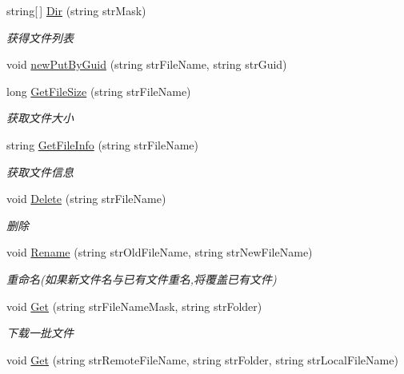 \begin{DoxyCompactItemize}
string\mbox{[}$\,$\mbox{]} \hyperlink{class_x_c_l_net_tools_1_1_f_t_p_1_1_f_t_p_client_a9563c1fa35e755073b9b279caaf7e354}{Dir} (string str\+Mask)
\begin{DoxyCompactList}\small\item\em 获得文件列表 \end{DoxyCompactList}\item 
void \hyperlink{class_x_c_l_net_tools_1_1_f_t_p_1_1_f_t_p_client_a502eb52b0575947170695c4fcbccc10a}{new\+Put\+By\+Guid} (string str\+File\+Name, string str\+Guid)
\item 
long \hyperlink{class_x_c_l_net_tools_1_1_f_t_p_1_1_f_t_p_client_a39be7d18214835a62484226fc12e2061}{Get\+File\+Size} (string str\+File\+Name)
\begin{DoxyCompactList}\small\item\em 获取文件大小 \end{DoxyCompactList}\item 
string \hyperlink{class_x_c_l_net_tools_1_1_f_t_p_1_1_f_t_p_client_abcdeced5a90923ad5788251d4012694f}{Get\+File\+Info} (string str\+File\+Name)
\begin{DoxyCompactList}\small\item\em 获取文件信息 \end{DoxyCompactList}\item 
void \hyperlink{class_x_c_l_net_tools_1_1_f_t_p_1_1_f_t_p_client_a1be296574d7342283c236d8b51ca2b04}{Delete} (string str\+File\+Name)
\begin{DoxyCompactList}\small\item\em 删除 \end{DoxyCompactList}\item 
void \hyperlink{class_x_c_l_net_tools_1_1_f_t_p_1_1_f_t_p_client_aaadb1ae86c64e8ec958e8333fc6b9bce}{Rename} (string str\+Old\+File\+Name, string str\+New\+File\+Name)
\begin{DoxyCompactList}\small\item\em 重命名(如果新文件名与已有文件重名,将覆盖已有文件) \end{DoxyCompactList}\item 
void \hyperlink{class_x_c_l_net_tools_1_1_f_t_p_1_1_f_t_p_client_a67852a51f561336c777b896af2e95990}{Get} (string str\+File\+Name\+Mask, string str\+Folder)
\begin{DoxyCompactList}\small\item\em 下载一批文件 \end{DoxyCompactList}\item 
void \hyperlink{class_x_c_l_net_tools_1_1_f_t_p_1_1_f_t_p_client_a87ce6305af9ccb5e04b0669bd0eac812}{Get} (string str\+Remote\+File\+Name, string str\+Folder, string str\+Local\+File\+Name)

\end{DoxyCompactItemize}
